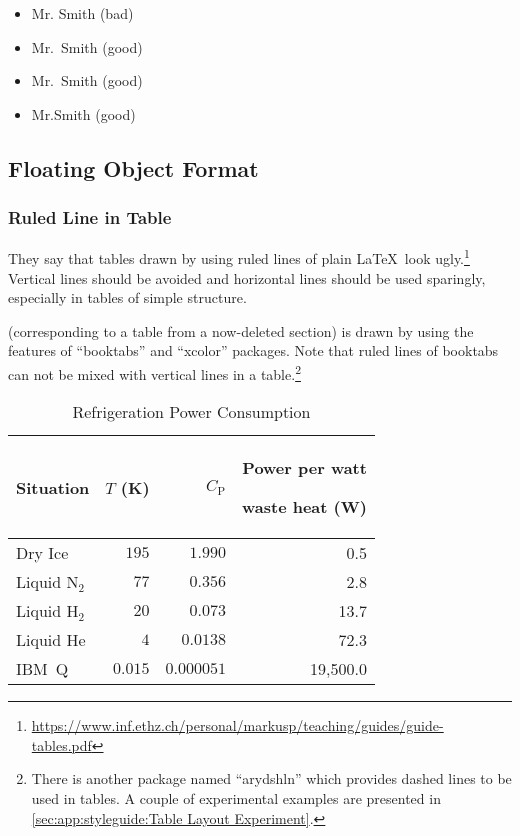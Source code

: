 \begin{itemize}[nosep]
	\item Mr. Smith (bad)
	\item Mr.~Smith (good)
	\item Mr.\ Smith (good)
	\item Mr.\@ Smith (good)
\end{itemize}

\subsection{Floating Object Format}
\label{sec:app:styleguide:Floating Object Format}

\subsubsection{Ruled Line in Table}
\label{sec:app:styleguide:Ruled Line in Table}

They say that tables drawn by using ruled lines of plain \LaTeX\
look ugly.\footnote{
  \url{https://www.inf.ethz.ch/personal/markusp/teaching/guides/guide-tables.pdf}
}
Vertical lines should be avoided and horizontal lines should be
used sparingly, especially in tables of simple structure.


\newcommand{\TLo}{T_\mathrm{L}}
\newcommand{\THi}{T_\mathrm{H}}
\newcommand{\CPf}{C_\mathrm{P}}

(corresponding to a table from a now-deleted section)
is drawn by using the features of ``booktabs'' and ``xcolor'' packages.
Note that ruled lines of booktabs can not be mixed with
vertical lines in a table.\footnote{
  There is another package named ``arydshln'' which provides dashed lines
  to be used in tables.
  A couple of experimental examples are presented in
  \cref{sec:app:styleguide:Table Layout Experiment}.
}

\begin{table}
\renewcommand*{\arraystretch}{1.2}\centering\small
\begin{tabular}{lrrr}\toprule
Situation
	& $T$ (K)
		& $\CPf$ & \parbox[b]{.75in}{\raggedleft Power per watt\par waste heat (W)} \\
\midrule
Dry Ice
	& $195$
		& $1.990$
			& 0.5 \\
Liquid N$_2$
	& $77$
		& $0.356$
			& 2.8 \\
Liquid H$_2$
	& $20$
		& $0.073$
			& 13.7 \\
Liquid He
	& $4$
		& $0.0138$
			& 72.3 \\
IBM~Q	& $0.015$
		& $0.000051$
			& 19,500.0 \\
\bottomrule
\end{tabular}
\caption{Refrigeration Power Consumption}
\label{tab:app:styleguide:Refrigeration Power Consumption}
\end{table}

